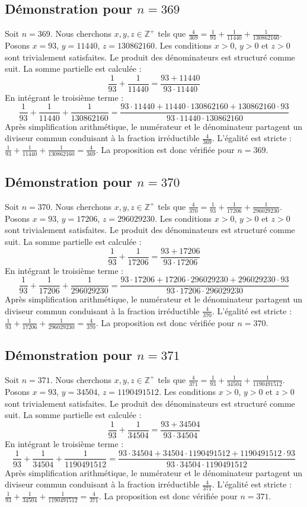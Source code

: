 \documentclass[11pt,a4paper]{article}
\begin{document}
\subsection{Démonstration pour $n = 369$}
Soit $n = 369$. Nous cherchons $x, y, z \in \mathbb{Z}^{+}$ tels que $\frac{4}{369} = \frac{1}{93} + \frac{1}{11440} + \frac{1}{130862160}$.
Posons $x = 93$, $y = 11440$, $z = 130862160$.
Les conditions $x > 0$, $y > 0$ et $z > 0$ sont trivialement satisfaites.
Le produit des dénominateurs est structuré comme suit. La somme partielle est calculée :
$$ \frac{1}{93} + \frac{1}{11440} = \frac{93+11440}{93 \cdot 11440} $$
En intégrant le troisième terme :
$$ \frac{1}{93} + \frac{1}{11440} + \frac{1}{130862160} = \frac{93 \cdot 11440 + 11440 \cdot 130862160 + 130862160 \cdot 93}{93 \cdot 11440 \cdot 130862160} $$
Après simplification arithmétique, le numérateur et le dénominateur partagent un diviseur commun conduisant à la fraction irréductible $\frac{4}{369}$.
L'égalité est stricte : $\frac{1}{93} + \frac{1}{11440} + \frac{1}{130862160} = \frac{4}{369}$.
La proposition est donc vérifiée pour $n = 369$.
\subsection{Démonstration pour $n = 370$}
Soit $n = 370$. Nous cherchons $x, y, z \in \mathbb{Z}^{+}$ tels que $\frac{4}{370} = \frac{1}{93} + \frac{1}{17206} + \frac{1}{296029230}$.
Posons $x = 93$, $y = 17206$, $z = 296029230$.
Les conditions $x > 0$, $y > 0$ et $z > 0$ sont trivialement satisfaites.
Le produit des dénominateurs est structuré comme suit. La somme partielle est calculée :
$$ \frac{1}{93} + \frac{1}{17206} = \frac{93+17206}{93 \cdot 17206} $$
En intégrant le troisième terme :
$$ \frac{1}{93} + \frac{1}{17206} + \frac{1}{296029230} = \frac{93 \cdot 17206 + 17206 \cdot 296029230 + 296029230 \cdot 93}{93 \cdot 17206 \cdot 296029230} $$
Après simplification arithmétique, le numérateur et le dénominateur partagent un diviseur commun conduisant à la fraction irréductible $\frac{4}{370}$.
L'égalité est stricte : $\frac{1}{93} + \frac{1}{17206} + \frac{1}{296029230} = \frac{4}{370}$.
La proposition est donc vérifiée pour $n = 370$.
\subsection{Démonstration pour $n = 371$}
Soit $n = 371$. Nous cherchons $x, y, z \in \mathbb{Z}^{+}$ tels que $\frac{4}{371} = \frac{1}{93} + \frac{1}{34504} + \frac{1}{1190491512}$.
Posons $x = 93$, $y = 34504$, $z = 1190491512$.
Les conditions $x > 0$, $y > 0$ et $z > 0$ sont trivialement satisfaites.
Le produit des dénominateurs est structuré comme suit. La somme partielle est calculée :
$$ \frac{1}{93} + \frac{1}{34504} = \frac{93+34504}{93 \cdot 34504} $$
En intégrant le troisième terme :
$$ \frac{1}{93} + \frac{1}{34504} + \frac{1}{1190491512} = \frac{93 \cdot 34504 + 34504 \cdot 1190491512 + 1190491512 \cdot 93}{93 \cdot 34504 \cdot 1190491512} $$
Après simplification arithmétique, le numérateur et le dénominateur partagent un diviseur commun conduisant à la fraction irréductible $\frac{4}{371}$.
L'égalité est stricte : $\frac{1}{93} + \frac{1}{34504} + \frac{1}{1190491512} = \frac{4}{371}$.
La proposition est donc vérifiée pour $n = 371$.
\end{document}
